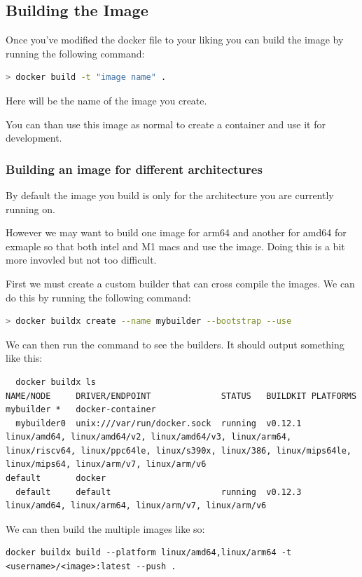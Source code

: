 \documentclass[final]{article}
\numberwithin{equation}{section}
\theoremstyle{remarkStyle}
\begin{document}
\subsection{Building the Image}
Once you've modified the docker file to your liking you can build the image by running the following command:
\begin{lstlisting}[language=bash]
  > docker build -t "image name" .
\end{lstlisting}
Here  will be the name of the image you create.

You can than use this image as normal to create a container and use it for development.

\subsubsection{Building an image for different architectures}
By default the image you build is only for the architecture you are currently running on.

However we may want to build one image for arm64 and another for amd64 for exmaple so that both intel and M1 macs and use the image.
Doing this is a bit more invovled but not too difficult.

First we must create a custom builder that can cross compile the images.
We can do this by running the following command:
\begin{lstlisting}[language=bash]
  > docker buildx create --name mybuilder --bootstrap --use
\end{lstlisting}

We can then run the  command to see the builders.
It should output something like this:
\begin{lstlisting}
  docker buildx ls
NAME/NODE     DRIVER/ENDPOINT              STATUS   BUILDKIT PLATFORMS
mybuilder *   docker-container
  mybuilder0  unix:///var/run/docker.sock  running  v0.12.1  linux/amd64, linux/amd64/v2, linux/amd64/v3, linux/arm64, linux/riscv64, linux/ppc64le, linux/s390x, linux/386, linux/mips64le, linux/mips64, linux/arm/v7, linux/arm/v6
default       docker
  default     default                      running  v0.12.3  linux/amd64, linux/arm64, linux/arm/v7, linux/arm/v6
\end{lstlisting}

We can then build the multiple images like so:

\begin {lstlisting}
docker buildx build --platform linux/amd64,linux/arm64 -t <username>/<image>:latest --push .
\end{lstlisting}
\end{document}
